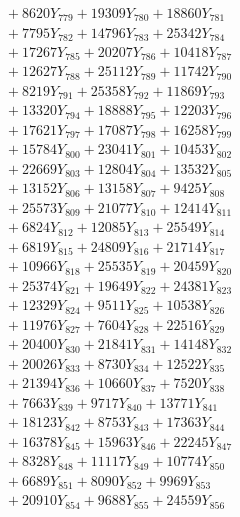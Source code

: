 \documentclass[a4paper,10pt]{article}
\begin{document}
{\begin{align}
&\;  + 8620 Y_{779} + 19309 Y_{780} + 18860 Y_{781} \\[0.3ex]
&\;  + 7795 Y_{782} + 14796 Y_{783} + 25342 Y_{784} \\[0.3ex]
&\;  + 17267 Y_{785} + 20207 Y_{786} + 10418 Y_{787} \\[0.3ex]
&\;  + 12627 Y_{788} + 25112 Y_{789} + 11742 Y_{790} \\[0.3ex]
&\;  + 8219 Y_{791} + 25358 Y_{792} + 11869 Y_{793} \\[0.3ex]
&\;  + 13320 Y_{794} + 18888 Y_{795} + 12203 Y_{796} \\[0.3ex]
&\;  + 17621 Y_{797} + 17087 Y_{798} + 16258 Y_{799} \\[0.3ex]
&\;  + 15784 Y_{800} + 23041 Y_{801} + 10453 Y_{802} \\[0.3ex]
&\;  + 22669 Y_{803} + 12804 Y_{804} + 13532 Y_{805} \\[0.3ex]
&\;  + 13152 Y_{806} + 13158 Y_{807} + 9425 Y_{808} \\[0.5ex]\allowbreak
&\;  + 25573 Y_{809} + 21077 Y_{810} + 12414 Y_{811} \\[0.3ex]
&\;  + 6824 Y_{812} + 12085 Y_{813} + 25549 Y_{814} \\[0.3ex]
&\;  + 6819 Y_{815} + 24809 Y_{816} + 21714 Y_{817} \\[0.3ex]
&\;  + 10966 Y_{818} + 25535 Y_{819} + 20459 Y_{820} \\[0.3ex]
&\;  + 25374 Y_{821} + 19649 Y_{822} + 24381 Y_{823} \\[0.3ex]
&\;  + 12329 Y_{824} + 9511 Y_{825} + 10538 Y_{826} \\[0.3ex]
&\;  + 11976 Y_{827} + 7604 Y_{828} + 22516 Y_{829} \\[0.3ex]
&\;  + 20400 Y_{830} + 21841 Y_{831} + 14148 Y_{832} \\[0.3ex]
&\;  + 20026 Y_{833} + 8730 Y_{834} + 12522 Y_{835} \\[0.3ex]
&\;  + 21394 Y_{836} + 10660 Y_{837} + 7520 Y_{838} \\[0.5ex]\allowbreak
&\;  + 7663 Y_{839} + 9717 Y_{840} + 13771 Y_{841} \\[0.3ex]
&\;  + 18123 Y_{842} + 8753 Y_{843} + 17363 Y_{844} \\[0.3ex]
&\;  + 16378 Y_{845} + 15963 Y_{846} + 22245 Y_{847} \\[0.3ex]
&\;  + 8328 Y_{848} + 11117 Y_{849} + 10774 Y_{850} \\[0.3ex]
&\;  + 6689 Y_{851} + 8090 Y_{852} + 9969 Y_{853} \\[0.3ex]
&\;  + 20910 Y_{854} + 9688 Y_{855} + 24559 Y_{856} \\[0.3ex]

\end{align}}
\end{document}
